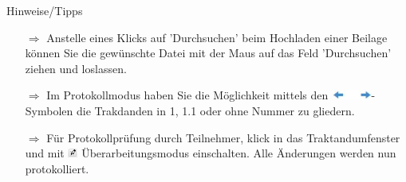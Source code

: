 \documentclass{article}
\begin{document}
\begin{beamerlikethm}{Hinweise/Tipps}
\begin{itemize}
  \item[$\Longrightarrow$] Anstelle eines Klicks auf 'Durchsuchen' beim Hochladen einer Beilage  können Sie die gewünschte Datei mit der Maus auf das Feld 'Durchsuchen' ziehen und loslassen.
  \item[$\Longrightarrow$] Im Protokollmodus haben Sie die Möglichkeit mittels den \includegraphics[height=9pt]{Icons/Pfeil-links-rechts.jpg}-Symbolen die Trakdanden in 1, 1.1 oder ohne Nummer zu gliedern.
	\item[$\Longrightarrow$] Für  Protokollprüfung durch Teilnehmer, klick in das Traktandumfenster und mit \includegraphics[height=9pt]{Icons/UeberarbModus.jpg} Überarbeitungsmodus einschalten. Alle Änderungen werden nun protokolliert.
\end{itemize}
\end{beamerlikethm}

	
	


\pagebreak


\vspace{\baselineskip}


\end{document}
